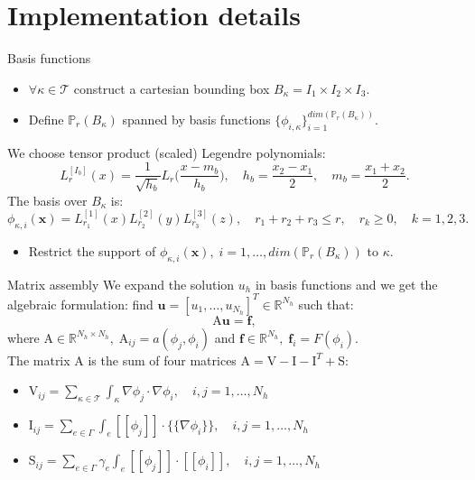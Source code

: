 \documentclass{beamer}
\begin{document}
\section{Implementation details}
\begin{frame}{Basis functions}
	\begin{itemize}
		\item $\forall \kappa \in \mathcal{T}$ construct a cartesian bounding 
		box $B_\kappa=I_1\times I_2 \times I_3$.
		\item Define $\mathbb{P}_r(B_\kappa)$ spanned by basis 
		functions $\{ \phi_{i,\kappa} \}_{i=1}^{dim(\mathbb{P}_r(B_\kappa))}$.
	\end{itemize}
	We choose tensor product (scaled) Legendre polynomials:
	\begin{equation*}
	L_r^{[I_b]} (x) = \frac{1}{\sqrt{h_b}} L_r \bigg( \frac{x-m_b}{h_b} \bigg), 
	\quad h_b = \frac{x_2-x_1}{2}, \quad m_b=\frac{x_1+x_2}{2}.
	\end{equation*}
	The basis over $B_\kappa$ is:
	\begin{equation*}
	\phi_{\kappa,i}(\mathbf{x}) = 
	L_{r_1}^{[1]}(x)L_{r_2}^{[2]}(y)L_{r_3}^{[3]}(z), \quad
	r_1+r_2+r_3 \leq r, \quad r_k \geq 0, \quad k = 1,2,3.
	\end{equation*}
	\begin{itemize}
		\item Restrict the support of $\phi_{\kappa, i}(\mathbf{x}), \; 
		i=1,\dots,dim(\mathbb{P}_r(B_\kappa))$ to $\kappa$.
	\end{itemize}
\end{frame}
\begin{frame}{Matrix assembly}
	We expand the solution $u_h$ in basis functions and we get the 
	algebraic formulation: find $\mathbf{u} = [u_1, \dots, u_{N_h}]^T \in 
	\mathbb{R}^{N_h} $ such that:
	\begin{equation*}
	\mathrm{A}\mathbf{u} = \mathbf{f},
	\end{equation*}
	where $\mathrm{A} \in \mathbb{R}^{N_h \times N_h}, \; \mathrm{A}_{ij} = 
	a(\phi_j, \phi_i)$ and $\mathbf{f} \in \mathbb{R}^{N_h}, \; \mathbf{f}_i = 
	F(\phi_i)$.\\
	\vspace*{0.4cm}
	The matrix $\mathrm{A}$ is the sum of four matrices $\mathrm{A} = 
	\mathrm{V} - \mathrm{I} - \mathrm{I}^T + \mathrm{S}$:\\
	\begin{itemize}
		\item $\mathrm{V}_{ij} = \sum\limits_{\kappa \in \mathcal{T}} 
		\int_\kappa 
		\nabla \phi_j \cdot \nabla \phi_i, \quad i,j=1,\dots,N_h$
		\item $\mathrm{I}_{ij} = \sum\limits_{e \in \Gamma} \int_e 
		[\![\phi_j]\!] 
		\cdot \{\!\!\{ \nabla \phi_i \}\!\!\}, \quad i,j=1,\dots,N_h$
		\item $\mathrm{S}_{ij} = \sum\limits_{e \in \Gamma} \gamma_e \int_e 
		[\![ 
		\phi_j ]\!] \cdot [\![ \phi_i ]\!], \quad i,j=1,\dots,N_h$
	\end{itemize}
\end{frame}
\end{document}
